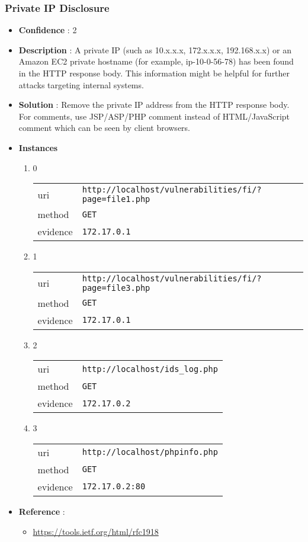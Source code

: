 \documentclass[10pt]{article}
\begin{document}
\subsubsection{Private IP Disclosure}
\begin{itemize}
\item[] \textbf{Confidence} : 2
\item[] \textbf{Description} : A private IP (such as 10.x.x.x, 172.x.x.x, 192.168.x.x) or an Amazon EC2 private hostname (for example, ip-10-0-56-78) has been found in the HTTP response body. This information might be helpful for further attacks targeting internal systems.
\item[] \textbf{Solution} :  Remove the private IP address from the HTTP response body.  For comments, use JSP/ASP/PHP comment instead of HTML/JavaScript comment which can be seen by client browsers.
\item[] \textbf{Instances}
\begin{enumerate}
\item[] 0
\begin{tabular}{| l | p{12cm}}
uri & \texttt{http://localhost/vulnerabilities/fi/?page=file1.php} \\
method & \texttt{GET} \\
evidence & \texttt{172.17.0.1} \\
\end{tabular}
\item[] 1
\begin{tabular}{| l | p{12cm}}
uri & \texttt{http://localhost/vulnerabilities/fi/?page=file3.php} \\
method & \texttt{GET} \\
evidence & \texttt{172.17.0.1} \\
\end{tabular}
\item[] 2
\begin{tabular}{| l | p{12cm}}
uri & \texttt{http://localhost/ids\_log.php} \\
method & \texttt{GET} \\
evidence & \texttt{172.17.0.2} \\
\end{tabular}
\item[] 3
\begin{tabular}{| l | p{12cm}}
uri & \texttt{http://localhost/phpinfo.php} \\
method & \texttt{GET} \\
evidence & \texttt{172.17.0.2:80} \\
\end{tabular}
\end{enumerate}
\item[] \textbf{Reference} : 
\begin{itemize}
\item \url{https://tools.ietf.org/html/rfc1918}
\end{itemize}
\end{itemize}
\end{document}
